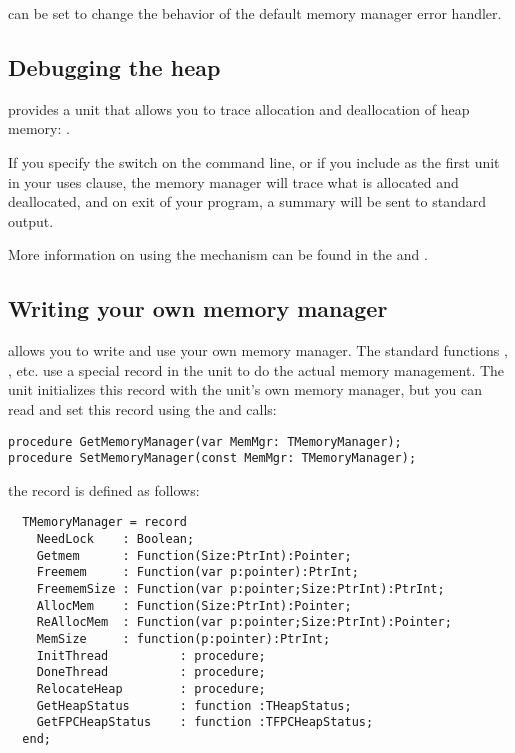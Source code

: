  can be set to change the behavior of 
the default memory manager error handler.

\subsection{Debugging the heap}

\fpc provides a unit that allows you to trace allocation and deallocation
of heap memory: .

If you specify the  switch on the command line, or if you include
 as the first unit in your uses clause, the memory manager
will trace what is allocated and deallocated, and on exit of your program,
a summary will be sent to standard output.

More information on using the  mechanism can be found in the
\userref and \unitsref.

\subsection{Writing your own memory manager}

\fpc allows you to write and use your own memory manager. The standard
functions , ,  etc.
use a special record in the  unit to do the actual memory management.
The  unit initializes this record with the  unit's own memory
manager, but you can read and set this record using the
 and  calls:
\begin{verbatim}
procedure GetMemoryManager(var MemMgr: TMemoryManager);
procedure SetMemoryManager(const MemMgr: TMemoryManager);
\end{verbatim}

the  record is defined as follows:
\begin{verbatim}
  TMemoryManager = record
    NeedLock    : Boolean;
    Getmem      : Function(Size:PtrInt):Pointer;
    Freemem     : Function(var p:pointer):PtrInt;
    FreememSize : Function(var p:pointer;Size:PtrInt):PtrInt;
    AllocMem    : Function(Size:PtrInt):Pointer;
    ReAllocMem  : Function(var p:pointer;Size:PtrInt):Pointer;
    MemSize     : function(p:pointer):PtrInt;
    InitThread          : procedure;
    DoneThread          : procedure;
    RelocateHeap        : procedure;
    GetHeapStatus       : function :THeapStatus;
    GetFPCHeapStatus    : function :TFPCHeapStatus;
  end;
\end{verbatim}

